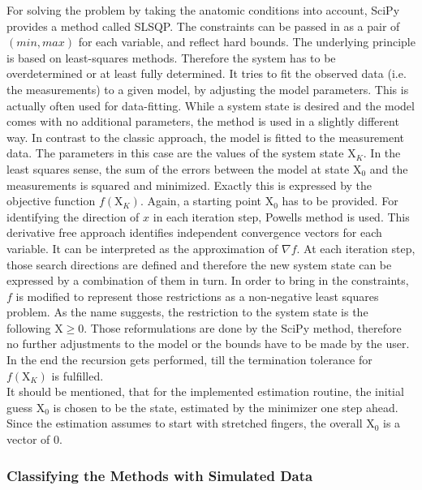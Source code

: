 For solving the problem by taking the anatomic conditions into account, SciPy provides a method called \ac{SLSQP}. The constraints can be passed in as a pair of $ (min,max) $ for each variable, and reflect hard bounds. The underlying principle is based on least-squares methods. Therefore the system has to be overdetermined or at least fully determined. It tries to fit the observed data (i.e. the measurements) to a given model, by adjusting the model parameters. This is actually often used for data-fitting. While a system state is desired and the model comes with no additional parameters, the method is used in a slightly different way. In contrast to the classic approach, the model is fitted to the measurement data. The parameters in this case are the values of the system state $ \mathrm{X}_K $. In the least squares sense, the sum of the errors between the model at state $ \mathrm{X}_{0} $ and the measurements is squared and minimized. Exactly this is expressed by the objective function $ f(\mathrm{X}_K) $. Again, a starting point $ \mathrm{X}_{0} $ has to be provided. For identifying the direction of $ x $ in each iteration step, Powells method \cite{powell1964efficient} is used. This derivative free approach identifies independent convergence vectors for each variable. It can be interpreted as the approximation of $ \nabla f $. At each iteration step, those search directions are defined and therefore the new system state can be expressed by a combination of them in turn. In order to bring in the constraints, $ f $ is modified to represent those restrictions as a non-negative least squares problem. As the name suggests, the restriction to the system state is the following $ \mathrm{X} \geq 0$. Those reformulations are done by the SciPy method, therefore no further adjustments to the model or the bounds have to be made by the user. In the end the recursion gets performed, till the termination tolerance for $ f(\mathrm{X}_K) $ is fulfilled.\\
It should be mentioned, that for the implemented estimation routine, the initial guess $ \mathrm{X}_{0} $ is chosen to be the state, estimated by the minimizer one step ahead. Since the estimation assumes to start with stretched fingers, the overall $ \mathrm{X}_{0} $ is a vector of 0.  


\subsubsection{Classifying the Methods with Simulated Data} \label{subsubsec:simEval}

